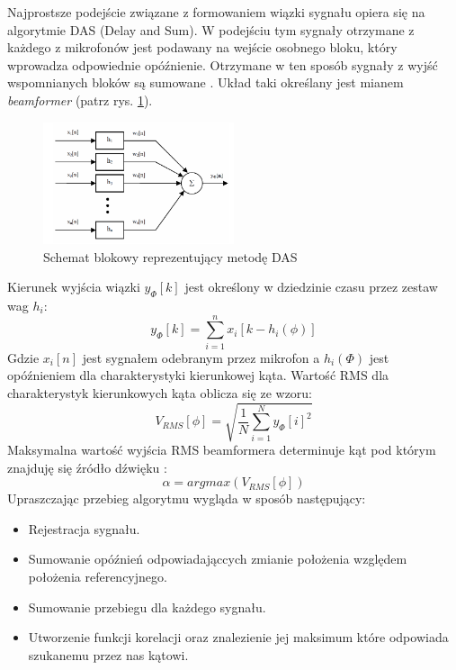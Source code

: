 \documentclass[eng,printmode]{mgr}
\begin{document}
Najprostsze podejście związane z formowaniem wiązki sygnału opiera się na algorytmie DAS (Delay and Sum). W podejściu tym sygnały otrzymane z każdego z mikrofonów jest podawany na wejście osobnego bloku, który wprowadza odpowiednie opóźnienie. Otrzymane w ten sposób sygnały z wyjść wspomnianych bloków są sumowane \cite{papez2013acoustic}. Układ taki określany jest mianem {\em beamformer} (patrz rys. \ref{fig-beamformer}).
\begin{figure}[ht]

    \centering

  \includegraphics[width=0.5\textwidth, angle=0]{DAS.png}

    \caption{Schemat blokowy reprezentujący metodę DAS \cite{papez2013acoustic}}
 \label{fig-beamformer}
    

\end{figure}
\newline 
Kierunek wyjścia wiązki $y_{\Phi}[k]$ jest określony w dziedzinie czasu przez zestaw wag $h_{i}$:
\begin{equation}
 y_{\Phi}[k] = \sum_{i=1}^n x_{i}[k-h_{i}(\phi)] 
\end{equation}
Gdzie $x_{i}[n]$ jest sygnałem odebranym przez mikrofon a $h_{i}(\Phi)$ jest opóźnieniem dla charakterystyki kierunkowej kąta.
Wartość RMS dla charakterystyk kierunkowych kąta oblicza się ze wzoru:
\begin{equation}
 V_{RMS}[\phi] = \sqrt{\frac{1}{N}\sum_{i=1}^N y_{\Phi}[i]^2 }
\end{equation}
Maksymalna wartość wyjścia RMS beamformera determinuje kąt pod którym znajduję się źródło dźwięku \cite{papez2013acoustic}:
\begin{equation}
 \alpha = argmax(V_{RMS}[\phi])
\end{equation}
 Upraszczając przebieg algorytmu wygląda w sposób następujący:
 \begin{itemize}
\item Rejestracja sygnału.
\item Sumowanie opóźnień odpowiadająccych zmianie położenia względem położenia referencyjnego. 
\item Sumowanie przebiegu dla każdego sygnału.
\item Utworzenie funkcji korelacji oraz znalezienie jej maksimum które odpowiada szukanemu przez nas kątowi.
\end{itemize}
\end{document}
